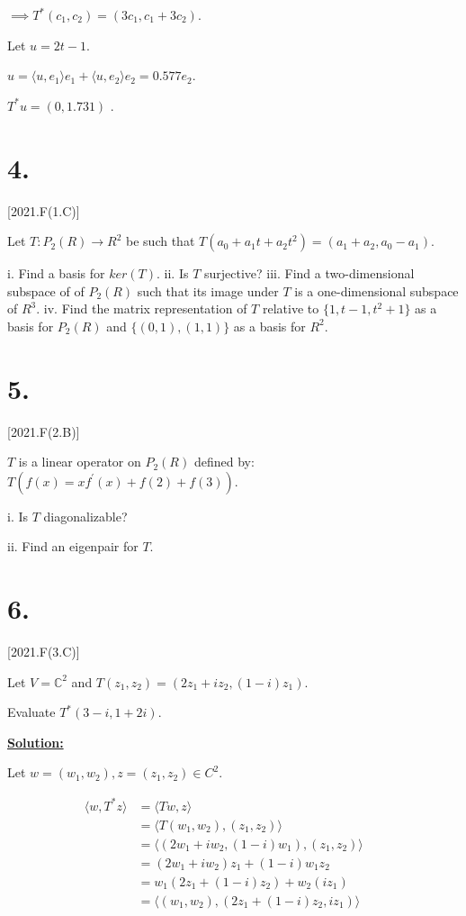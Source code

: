 \documentclass{article}
\begin{document}
  $\implies T^*(c_1, c_2) = (3c_1, c_1 + 3c_2)$.
  \newline

  Let $u = 2t-1$.

  $u 
  = \langle u, e_1 \rangle e_1  + \langle u, e_2 \rangle e_2
  = 0.577 e_2$.

  $T^*u 
  = (0, 1.731)
  $ .

  \newpage


  \section*{4.}[2021.F(1.C)]

  Let $T: P_2(R) \rightarrow R^2$ be such that $T(a_0 + a_1t + a_2t^2) = (a_1+a_2, a_0-a_1)$.

  i. Find a basis for $ker(T)$.
  ii. Is $T$ surjective?
  iii. Find a two-dimensional subspace of of $P_2(R)$ such that its image under $T$ is a one-dimensional subspace of $R^3$.
  iv. Find the matrix representation of $T$ relative to $\{1, t-1, t^2+1 \}$ as a basis for $P_2(R)$ 
  and $\{(0,1), (1,1)\}$ as a basis for $R^2$.

  \newpage


  \section*{5.}[2021.F(2.B)]

  $T$ is a linear operator on $P_2(R)$ defined by:
  \qquad $T(f(x)=xf^\prime(x) + f(2) + f(3))$.

  i. Is $T$ diagonalizable?

  ii. Find an eigenpair for $T$.

  \newpage


  \section*{6.}[2021.F(3.C)]

  Let $V = \mathbb{C}^2$ and $T(z_1, z_2) = (2z_1 + iz_2, (1-i)z_1)$. 
  
  Evaluate $T^*(3-i, 1+2i)$.
  
  
  \begin{center}
    \textbf{\underline{Solution:}}  
  \end{center}

  Let $w = (w_1, w_2), z = (z_1, z_2) \in C^2$.

  \begin{align*}
    \langle
      w, T^*z
    \rangle
    &=
    \langle
      Tw, z
    \rangle &&\\
    &=
    \langle
      T(w_1, w_2), (z_1, z_2)
    \rangle &&\\
    &=
    \langle
      (2w_1 + iw_2, (1-i)w_1), (z_1, z_2)
    \rangle &&\\
    &=
    (2w_1 + iw_2)z_1 + (1-i)w_1z_2 &&\\
    &=
    w_1(2z_1 + (1-i)z_2) + w_2(iz_1) &&\\
    &=
    \langle
      (w_1, w_2), (2z_1 + (1-i)z_2, iz_1)
    \rangle
  \end{align*}
\end{document}
